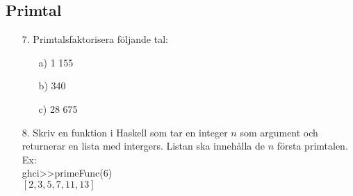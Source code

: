 \documentclass{article}
\begin{document}
\subsection*{Primtal}
\begin{enumerate}

\item[7.]
Primtalsfaktorisera följande tal:
\begin{itemize}
\item[a) ] 1 155
\item[b) ] 340
\item[c) ] 28 675
\end{itemize}

\item[8.]
Skriv en funktion i Haskell som tar en integer $n$ som argument och returnerar en lista med intergers. 
Listan ska innehålla de $n$ första primtalen.\\

Ex:\\
ghci>>primeFunc(6)\\
$[2,3,5,7,11,13]$\\
\end{enumerate}
\end{document}
